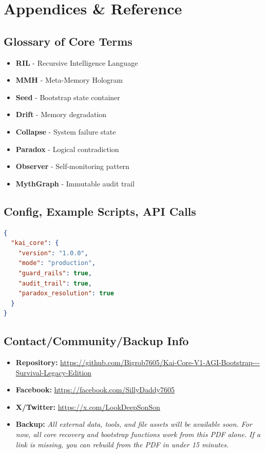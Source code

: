 \documentclass[11pt]{report}
\newcommand{\mainrepo}{\url{https://github.com/Bigrob7605/Kai-Core-V1-AGI-Bootstrap---Survival-Legacy-Edition}}
\newcommand{\mainfb}{\url{https://facebook.com/SillyDaddy7605}}
\newcommand{\mainx}{\url{https://x.com/LookDeepSonSon}}
\newcommand{\linknote}{\textit{All external data, tools, and file assets will be available soon. For now, all core recovery and bootstrap functions work from this PDF alone. If a link is missing, you can rebuild from the PDF in under 15 minutes.}}
\begin{document}
\chapter{Appendices \& Reference}

\section{Glossary of Core Terms}
\begin{itemize}
\item \textbf{RIL} - Recursive Intelligence Language
\item \textbf{MMH} - Meta-Memory Hologram
\item \textbf{Seed} - Bootstrap state container
\item \textbf{Drift} - Memory degradation
\item \textbf{Collapse} - System failure state
\item \textbf{Paradox} - Logical contradiction
\item \textbf{Observer} - Self-monitoring pattern
\item \textbf{MythGraph} - Immutable audit trail
\end{itemize}

\section{Config, Example Scripts, API Calls}
\begin{lstlisting}[language=json,caption={Example Config}]
{
  "kai_core": {
    "version": "1.0.0",
    "mode": "production",
    "guard_rails": true,
    "audit_trail": true,
    "paradox_resolution": true
  }
}
\end{lstlisting}

\section{Contact/Community/Backup Info}
\begin{itemize}
\item \textbf{Repository:} \mainrepo
\item \textbf{Facebook:} \mainfb
\item \textbf{X/Twitter:} \mainx
\item \textbf{Backup:} \linknote
\end{itemize}
\end{document}
